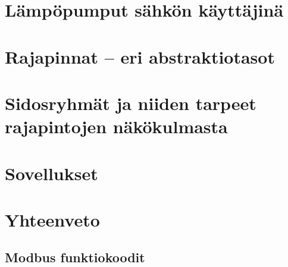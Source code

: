 \documentclass{tauthesis}
\begin{document}
\chapter{Lämpöpumput sähkön käyttäjinä}
\label{ch:pumput_sahkon_kayttajina}


\chapter{Rajapinnat -- eri abstraktiotasot}
\label{ch:rajapinat}


\chapter{Sidosryhmät ja niiden tarpeet rajapintojen näkökulmasta}
\label{ch:sidosryhmat}


\chapter{Sovellukset}
\label{ch:sovellukset}


\chapter{Yhteenveto}
\label{ch:yhteenveto}


\printbibliography[heading=bibintoc]


\begin{appendices}

\chapter{Modbus funktiokoodit}
\label{app:modbus_funktio_koodit}


\end{appendices}
\end{document}

